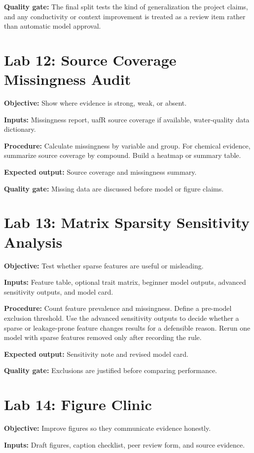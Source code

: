 \textbf{Quality gate:} The final split tests the kind of generalization the project claims, and any conductivity or context improvement is treated as a review item rather than automatic model approval.

\section{Lab 12: Source Coverage Missingness Audit}
\textbf{Objective:} Show where evidence is strong, weak, or absent.

\textbf{Inputs:} Missingness report, uafR source coverage if available, water-quality data dictionary.

\textbf{Procedure:} Calculate missingness by variable and group. For chemical evidence, summarize source coverage by compound. Build a heatmap or summary table.

\textbf{Expected output:} Source coverage and missingness summary.

\textbf{Quality gate:} Missing data are discussed before model or figure claims.

\section{Lab 13: Matrix Sparsity Sensitivity Analysis}
\textbf{Objective:} Test whether sparse features are useful or misleading.

\textbf{Inputs:} Feature table, optional trait matrix, beginner model outputs, advanced sensitivity outputs, and model card.

\textbf{Procedure:} Count feature prevalence and missingness. Define a pre-model exclusion threshold. Use the advanced sensitivity outputs to decide whether a sparse or leakage-prone feature changes results for a defensible reason. Rerun one model with sparse features removed only after recording the rule.

\textbf{Expected output:} Sensitivity note and revised model card.

\textbf{Quality gate:} Exclusions are justified before comparing performance.

\section{Lab 14: Figure Clinic}
\textbf{Objective:} Improve figures so they communicate evidence honestly.

\textbf{Inputs:} Draft figures, caption checklist, peer review form, and source evidence.

